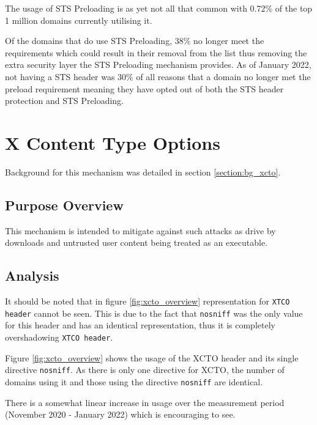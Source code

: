 \documentclass{mscreport}
\begin{document}
\noindent
The usage of STS Preloading is as yet not all that common with 0.72\% of the top 1 million domains currently utilising it.

\vspace{0.3cm} \noindent
Of the domains that do use STS Preloading, 38\% no longer meet the requirements which could result in their removal from the list thus removing the extra security layer the STS Preloading mechanism provides. As of January 2022, not having a STS header was 30\% of all reasons that a domain no longer met the preload requirement meaning they have opted out of both the STS header protection and STS Preloading.

\newpage

\section{X Content Type Options}
\label{section:ana_xcto}

Background for this mechanism was detailed in section \ref{section:bg_xcto}.

\subsection{Purpose Overview}

\noindent
This mechanism is intended to mitigate against such attacks as drive by downloads and untrusted user content being treated as an executable.


\subsection{Analysis}


\noindent
It should be noted that in figure \ref{fig:xcto_overview} representation for \texttt{XTCO header} cannot be seen. This is due to the fact that \texttt{nosniff} was the only value for this header and has an identical representation, thus it is completely overshadowing \texttt{XTCO header}.

\vspace{0.3cm} \noindent
Figure \ref{fig:xcto_overview} shows the usage of the XCTO header and its single directive \texttt{nosniff}. As there is only one directive for XCTO, the number of domains using it and those using the directive \texttt{nosniff} are identical.

\vspace{0.3cm} \noindent
There is a somewhat linear increase in usage over the measurement period (November 2020 - January 2022) which is encouraging to see.
\end{document}
